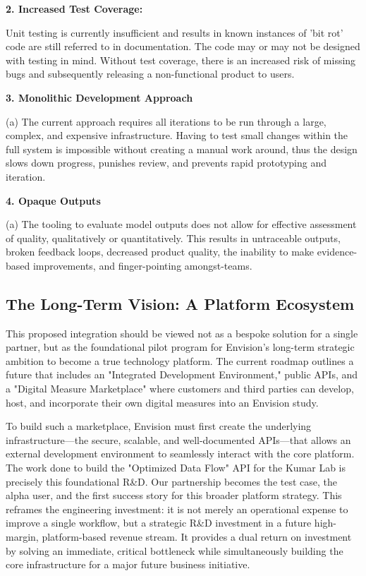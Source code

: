 \documentclass[11pt,onecolumn]{article}
\begin{document}
\textbf{2. Increased Test Coverage:}

Unit testing is currently insufficient and results in known instances of 'bit rot' code are still referred to in documentation. The code may or may not be designed with testing in mind. Without test coverage, there is an increased risk of missing bugs and subsequently releasing a non-functional product to users.

\textbf{3. Monolithic Development Approach}

(a) The current approach requires all iterations to be run through a large, complex, and expensive infrastructure. Having to test small changes within the full system is impossible without creating a manual work around, thus the design slows down progress, punishes review, and prevents rapid prototyping and iteration.

\textbf{4. Opaque Outputs}

(a) The tooling to evaluate model outputs does not allow for effective assessment of quality, qualitatively or quantitatively. This results in untraceable outputs, broken feedback loops, decreased product quality, the inability to make evidence-based improvements, and finger-pointing amongst-teams.

\subsection{The Long-Term Vision: A Platform Ecosystem}

This proposed integration should be viewed not as a bespoke solution for a single partner, but as the foundational pilot program for Envision's long-term strategic ambition to become a true technology platform. The current roadmap outlines a future that includes an "Integrated Development Environment," public APIs, and a "Digital Measure Marketplace" where customers and third parties can develop, host, and incorporate their own digital measures into an Envision study.

To build such a marketplace, Envision must first create the underlying infrastructure—the secure, scalable, and well-documented APIs—that allows an external development environment to seamlessly interact with the core platform. The work done to build the "Optimized Data Flow" API for the Kumar Lab is precisely this foundational R\&D. Our partnership becomes the test case, the alpha user, and the first success story for this broader platform strategy. This reframes the engineering investment: it is not merely an operational expense to improve a single workflow, but a strategic R\&D investment in a future high-margin, platform-based revenue stream. It provides a dual return on investment by solving an immediate, critical bottleneck while simultaneously building the core infrastructure for a major future business initiative.
\end{document}
